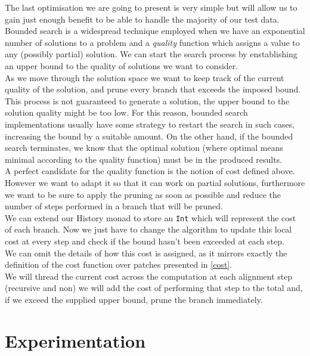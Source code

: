 \documentclass[11pt, titlepage]{article}
\begin{document}
The last optimisation we are going to present is very simple but will allow us to gain just enough benefit to be able to handle the majority of our test data. 
Bounded search is a widespread technique employed when we have an exponential number of solutions to a problem and a \emph{quality} function which assigns a value to any (possibly partial) solution. We can start the search process by enstablishing an upper bound to the quality of solutions we want to consider. 
\\
As we move through the solution space we want to keep track of the current quality of the solution, and prune every branch that exceeds the imposed bound. 
This process is not guaranteed to generate a solution, the upper bound to the solution quality might be too low. For this reason, bounded search implementations usually have some strategy to restart the search in such cases, increasing the bound by a suitable amount. On the other hand, if the bounded search terminates, we know that the optimal solution (where optimal means minimal according to the quality function) must be in the produced results.
\\
A perfect candidate for the quality function is the notion of cost defined above. However we want to adapt it so that it can work on partial solutions, furthermore we want to be sure to apply the pruning as soon as possible and reduce the number of steps performed in a branch that will be pruned.
\\
We can extend our History monad to store an \texttt{Int} which will represent the cost of each branch. Now we just have to change the algorithm to update this local cost at every step and check if the bound hasn't been exceeded at each step. 
\\
We can omit the details of how this cost is assigned, as it mirrors exactly the definition of the cost function over patches presented in \ref{cost}. 
\\
We will thread the current cost across the computation at each alignment step (recursive and non) we will add the cost of performing that step to the total and, if we exceed the supplied upper bound, prune the branch immediately.

\section{Experimentation}
\end{document}
